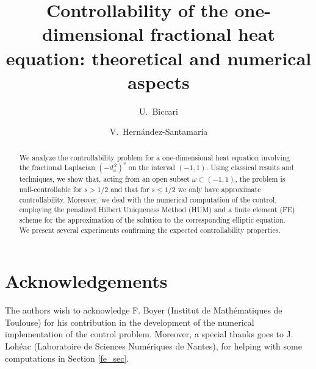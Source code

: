 \documentclass[preprint,1p]{amsart}
\title[Controllability fractional heat equation]{Controllability of the one-dimensional fractional heat equation: theoretical and numerical aspects}
\author{U.~Biccari}
\author{V.~Hern\'andez-Santamar\'ia}
\numberwithin{equation}{section}
\numberwithin{equation}{section}
\numberwithin{theorem}{section}
\numberwithin{remark}{section}
\numberwithin{lemma}{section}
\numberwithin{proposition}{section}
\numberwithin{definition}{section}
\newcommand{\fl}[2]{(-d_x^{\,2})^{#1}#2}
\begin{document}


\maketitle

\begin{abstract}
We analyze the controllability problem for a one-dimensional heat equation involving the fractional Laplacian $\fl{s}{}$ on the interval $(-1,1)$. Using classical results and techniques, we show that, acting from an open subset $\omega\subset(-1,1)$, the problem is null-controllable for $s>1/2$ and that for $s\leq 1/2$ we only have approximate controllability. Moreover, we deal with the numerical computation of the control, employing the penalized Hilbert Uniqueness Method (HUM) and a finite element (FE) scheme for the approximation of the solution to the corresponding elliptic equation. We present several experiments confirming the expected controllability properties.
\end{abstract}





%
%

\section*{Acknowledgements}
The authors wish to acknowledge F. Boyer (Institut de Math\'ematiques de Toulouse) for his contribution in the development of the numerical implementation of the control problem. Moreover, a special thanks goes to J. Loh\'eac (Laboratoire de Sciences Num\'eriques de Nantes), for helping with some computations in Section \ref{fe_sec}.  


\end{document}
